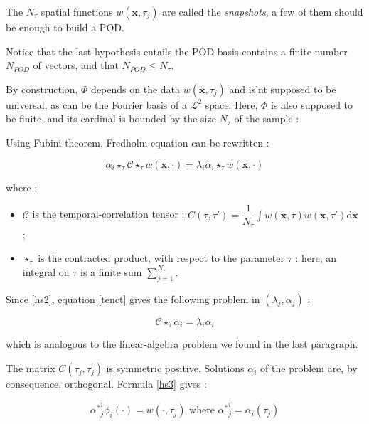 The $N_{\tau}$ spatial functions $w(\mathbf{x}, \tau_j)$ are called the \emph{snapshots}, a few of them should be enough to build a POD.

\par
Notice that the last hypothesis entails the POD basis contains a finite number $N_{POD}$ of vectors, and that $N_{POD}\leq N_{\tau}$.

\par
By construction, $\Phi$ depends on the data $w(\mathbf{x},\tau_j)$ and is'nt supposed to be universal, as can be the Fourier basis of a $\mathcal{L}^2$ space. %
Here, $\Phi$ is also supposed to be finite, and its cardinal is bounded by the size $N_{\tau}$ of the sample :


Using Fubini theorem, Fredholm equation can be rewritten :

\begin{equation}\label{tenct}
\alpha_i\star_{\tau}\mathcal{C}\star_{\tau}w(\mathbf{x},\cdot)=\lambda_i\alpha_i\star_{\tau}w(\mathbf{x},\cdot)
\end{equation}

where :
\begin{itemize}
\item $\mathcal{C}$ is the temporal-correlation tensor : $\displaystyle C(\tau,\tau ')=\dfrac{1}{N_{\tau}}\int w(\mathbf{x},\tau)w(\mathbf{x},\tau')\text{d}\mathbf{x}$ ;
\item $\star_{\tau}$ is the contracted product, with respect to the parameter $\tau$ : here, an integral on $\tau$ is a finite sum $\sum\limits_{j=1}^{N_{\tau}}$.
\end{itemize}

Since \ref{hs2}, equation \ref{tenct} gives the following problem in $(\lambda_j , \alpha_j)$ :

\begin{equation}\label{tenct}
\mathcal{C}\star_{\tau}\alpha_i\mathbf=\lambda_i\alpha_i
\end{equation}

which is analogous to the linear-algebra problem we found in the last paragraph.

\par
The matrix $C(\tau_j,\tau_j^{'})$ is symmetric positive. Solutions $\alpha_i$ of the problem are, by consequence, %
orthogonal. Formula \ref{hs3} gives :

\[{\alpha^{\ast}}_j^i\phi_i(\cdot )=w(\cdot ,\tau_j)\text{ where ${\alpha^{\ast}}_j^i=\alpha_i(\tau_j)$}\]


